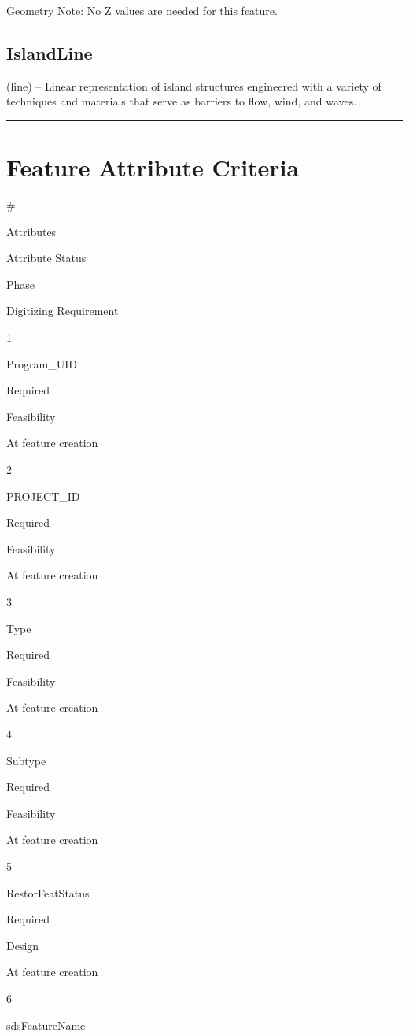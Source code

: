 \documentclass[
  letterpaper,
  DIV=11,
  numbers=noendperiod]{scrreprt}
\begin{document}
Geometry Note: No Z values are needed for this feature.

\subsection{IslandLine}\label{islandline}

(line) -- Linear representation of island structures engineered with a
variety of techniques and materials that serve as barriers to flow,
wind, and waves.

\begin{center}\rule{0.5\linewidth}{0.5pt}\end{center}

\section{Feature Attribute Criteria}\label{feature-attribute-criteria-6}

\#

Attributes

Attribute Status

Phase

Digitizing Requirement

1

Program\_UID

Required

Feasibility

At feature creation

2

PROJECT\_ID

Required

Feasibility

At feature creation

3

Type

Required

Feasibility

At feature creation

4

Subtype

Required

Feasibility

At feature creation

5

RestorFeatStatus

Required

Design

At feature creation

6

sdsFeatureName
\end{document}

